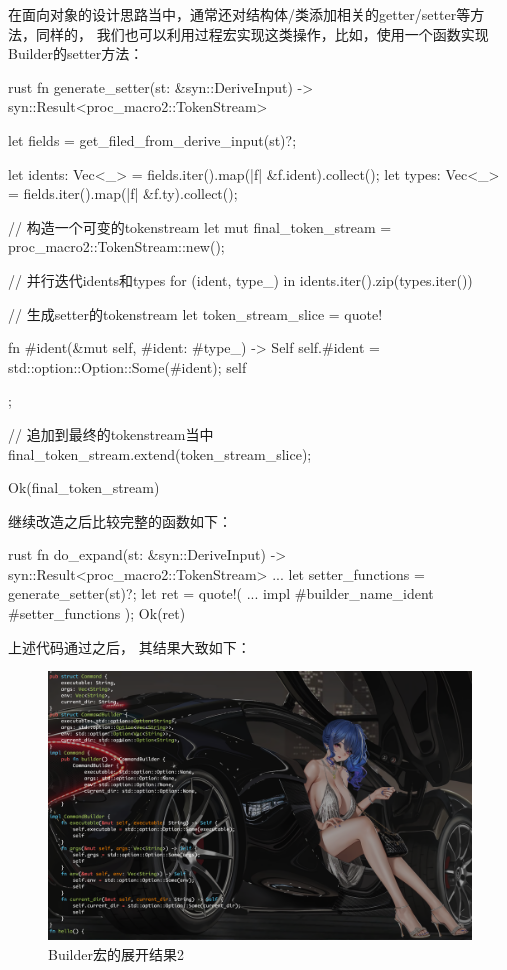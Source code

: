 在面向对象的设计思路当中，通常还对结构体/类添加相关的getter/setter等方法，同样的，
我们也可以利用过程宏实现这类操作，比如，使用一个函数实现Builder的setter方法：
\begin{code-block}{rust}
fn generate_setter(st: &syn::DeriveInput) -> syn::Result<proc_macro2::TokenStream> {
    let fields = get_filed_from_derive_input(st)?;

    let idents: Vec<_> = fields.iter().map(|f| &f.ident).collect();
    let types: Vec<_> = fields.iter().map(|f| &f.ty).collect();

    // 构造一个可变的tokenstream
    let mut final_token_stream = proc_macro2::TokenStream::new();

    // 并行迭代idents和types
    for (ident, type_) in idents.iter().zip(types.iter()) {
        // 生成setter的tokenstream
        let token_stream_slice = quote! {

            fn #ident(&mut self, #ident: #type_) -> Self {
                self.#ident = std::option::Option::Some(#ident);
                self
            }

        };

        // 追加到最终的tokenstream当中
        final_token_stream.extend(token_stream_slice);
    }
    Ok(final_token_stream)
}
\end{code-block}

继续改造之后比较完整的函数如下：
\begin{code-block}{rust}
fn do_expand(st: &syn::DeriveInput) -> syn::Result<proc_macro2::TokenStream> {
    ...
    let setter_functions = generate_setter(st)?;
    let ret = quote!(
        ...
        impl #builder_name_ident {
            #setter_functions
        }
    );
    Ok(ret)
}
\end{code-block}
上述代码通过之后，
其结果大致如下：
\begin{figure}[H]
  \centering
  \includegraphics[width=\linewidth]{rust_expand_2.png}
  \caption{Builder宏的展开结果2}
  \label{fig:rust_expand_2}
\end{figure}

